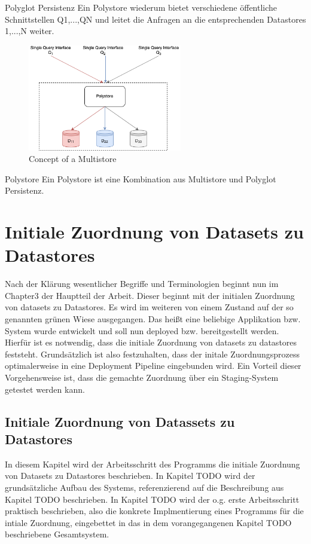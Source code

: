 Polyglot Persistenz
Ein Polystore wiederum bietet verschiedene öffentliche Schnittstellen Q1,...,QN und leitet die Anfragen an die entsprechenden 
Datastores 1,...,N weiter.

\begin{figure}[htbp]
    \centering
    \includegraphics[width=0.60\textwidth]{gfx/examples/master_thesis-polystore.png}
    \caption{Concept of a Multistore}
    \label{fig:multistore}
\end{figure} 

Polystore
Ein Polystore ist eine Kombination aus Multistore und Polyglot Persistenz.


\chapter{Initiale Zuordnung von Datasets zu Datastores}

Nach der Klärung wesentlicher Begriffe und Terminologien beginnt nun im Chapter3 der Hauptteil
der Arbeit. Dieser beginnt mit der initialen Zuordnung von datasets zu Datastores.
Es wird im weiteren von einem Zustand auf der so genannten grünen Wiese ausgegangen.
Das heißt eine beliebige Applikation bzw. System wurde entwickelt und soll nun 
deployed bzw. bereitgestellt werden. Hierfür ist es notwendig, dass die initiale
Zuordnung von datasets zu datastores feststeht.
Grundsätzlich ist also festzuhalten, dass der initale Zuordnungsprozess 
optimalerweise in eine Deployment Pipeline eingebunden wird.
Ein Vorteil dieser Vorgehensweise ist, dass die gemachte Zuordnung über ein 
Staging-System getestet werden kann.

\section{Initiale Zuordnung von Datassets zu Datastores}
\label{sec:main:init}
In diesem Kapitel wird der Arbeitsschritt des Programms die initiale Zuordnung von Datasets
zu Datastores beschrieben. In Kapitel TODO wird der grundsätzliche Aufbau des Systems,
referenzierend auf die Beschreibung aus Kapitel TODO beschrieben. \newline
In Kapitel TODO wird der o.g. erste Arbeitsschritt praktisch beschrieben, also die 
konkrete Implmentierung eines Programms für die intiale Zuordnung, eingebettet in das
in dem vorangegangenen Kapitel TODO beschriebene Gesamtsystem.
\newpage
